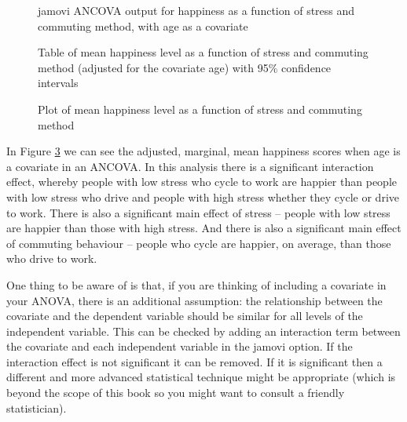 \begin{figure}[!htb]
\begin{center}
\caption{jamovi ANCOVA output for happiness as a function of stress and commuting method, with age as a covariate}
\label{fig:ancova2}
\HR
\end{center}
\end{figure}

\begin{figure}[!htb]
\begin{center}
\caption{Table of mean happiness level as a function of stress and commuting method (adjusted for the covariate age) with 95\% confidence intervals}
\label{fig:ancova3}
\HR
\end{center}
\end{figure}

\begin{figure}[!htb]
\begin{center}
\caption{Plot of mean happiness level as a function of stress and commuting method}
\label{fig:ancova4}
\HR
\end{center}
\end{figure}

In Figure \ref{fig:ancova4} we can see the adjusted, marginal, mean happiness scores when age is a covariate in an ANCOVA. In this analysis there is a significant interaction effect, whereby people with low stress who cycle to work are happier than people with low stress who drive and people with high stress whether they cycle or drive to work. There is also a significant main effect of stress – people with low stress are happier than those with high stress. And there is also a significant main effect of commuting behaviour – people who cycle are happier, on average, than those who drive to work.  

One thing to be aware of is that, if you are thinking of including a covariate in your ANOVA, there is an additional assumption: the relationship between the covariate and the dependent variable should be similar for all levels of the independent variable. This can be checked by adding an interaction term between the covariate and each independent variable in the jamovi  option. If the interaction effect is not significant it can be removed. If it is significant then a different and more advanced statistical technique might be appropriate (which is beyond the scope of this book so you might want to consult a friendly statistician).



